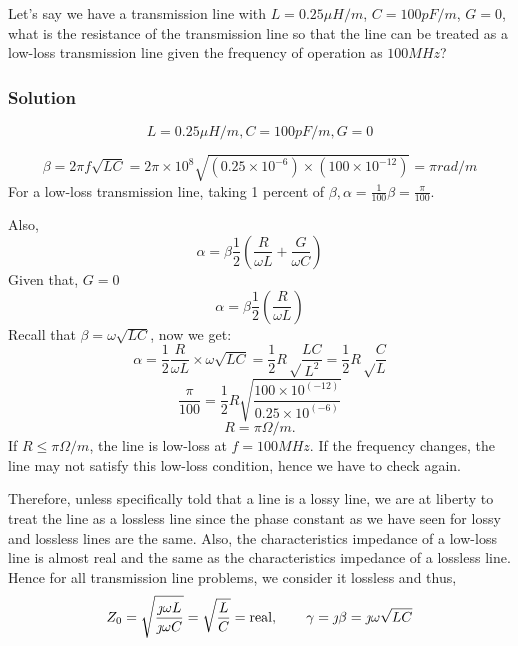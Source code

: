 \begin{exmp}
Let's say we have a transmission line with $L = 0.25\mu H/m$, ${C= 100pF/m}$, $G = 0$, what is the resistance of the transmission line so that the line can be treated as a low-loss transmission line given the frequency of operation as $100MHz$?

\subsubsection*{Solution}
\[L= 0.25\mu H/m,C= 100pF/m, G = 0\]

\begin{dmath*}
\beta = 2\pi f\sqrt{LC}
=2 \pi \times 10^8 \sqrt{(0.25 \times 10^{-6}) \times (100 \times 10^{-12})}  = \pi rad/m
\end{dmath*}
For a low-loss transmission line, taking 1 percent of $\beta,
\alpha= \frac{1}{100}\beta = \frac{\pi}{100}$.

Also,
\begin{equation*}
\alpha = \beta\frac{1}{2} \left(\frac{R}{\omega L} + \frac{G}{\omega C}\right)
\end{equation*}
Given that, \(G=0\)
\begin{equation*}
\alpha = \beta\frac{1}{2} \left(\frac{R}{\omega L}\right)
\end{equation*}
Recall that $\beta = \omega\sqrt{LC} $, now we get:
\begin{dmath*}
\alpha = \frac{1}{2}\frac{R}{\omega L} \times \omega\sqrt{LC} = \frac{1}{2} R \sqrt \frac{LC}{L^{2}} = \frac{1}{2} R \sqrt \frac{C}{L}
\end{dmath*}
\begin{equation*}
\frac{\pi}{100} = \frac{1}{2} R \sqrt{\frac{100 \times 10^{(-12)}}{0.25 \times 10^{(-6)}}}
\end{equation*}
\begin{equation*}
R=\pi\Omega/m.
\end{equation*}
If $R \leq \pi\Omega/m$, the line is low-loss at $ f= 100MHz$. If the frequency changes, the line may not satisfy this low-loss condition, hence we have to check again.
\end{exmp}

Therefore, unless specifically told that a line is a lossy line, we are at liberty to treat the line as a lossless line since the phase constant as we have seen for lossy and lossless lines are the same. Also, the characteristics impedance of a low-loss line is almost real and the same as the characteristics impedance of a lossless line. Hence for all transmission line problems, we consider it lossless and thus, 
\begin{align*}
Z_0 = \sqrt{{\frac{\jmath\omega L}{\jmath\omega C}}} = \sqrt{\frac{L}{C}} = \textnormal{real}, \quad \quad \gamma= \jmath\beta = \jmath\omega\sqrt{LC}
\end{align*}


